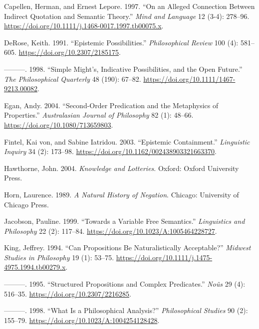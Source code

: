 \documentclass[
  11pt,
  letterpaper,
  DIV=11,
  numbers=noendperiod]{scrartcl}
\newlength{\cslhangindent}
\newenvironment{CSLReferences}[2] %
 {\begin{list}{}{%
  \setlength{\itemindent}{0pt}
  \setlength{\leftmargin}{0pt}
  \setlength{\parsep}{0pt}
  \ifodd #1
   \setlength{\leftmargin}{\cslhangindent}
   \setlength{\itemindent}{-1\cslhangindent}
  \fi
  \setlength{\itemsep}{#2\baselineskip}}}
 {\end{list}}
\begin{document}
\label{refs}
\begin{CSLReferences}{1}{0}
Capellen, Herman, and Ernest Lepore. 1997. {``On an Alleged Connection
Between Indirect Quotation and Semantic Theory.''} \emph{Mind and
Language} 12 (3-4): 278--96.
\url{https://doi.org/10.1111/j.1468-0017.1997.tb00075.x}.

DeRose, Keith. 1991. {``Epistemic Possibilities.''} \emph{Philosophical
Review} 100 (4): 581--605. \url{https://doi.org/10.2307/2185175}.

---------. 1998. {``Simple Might's, Indicative Possibilities, and the
Open Future.''} \emph{The Philosophical Quarterly} 48 (190): 67--82.
\url{https://doi.org/10.1111/1467-9213.00082}.

Egan, Andy. 2004. {``Second-Order Predication and the Metaphysics of
Properties.''} \emph{Australasian Journal of Philosophy} 82 (1): 48--66.
\url{https://doi.org/10.1080/713659803}.

Fintel, Kai von, and Sabine Iatridou. 2003. {``Epistemic Containment.''}
\emph{Linguistic Inquiry} 34 (2): 173--98.
\url{https://doi.org/10.1162/002438903321663370}.

Hawthorne, John. 2004. \emph{Knowledge and Lotteries}. Oxford: Oxford
University Press.

Horn, Laurence. 1989. \emph{A Natural History of Negation}. Chicago:
University of Chicago Press.

Jacobson, Pauline. 1999. {``Towards a Variable Free Semantics.''}
\emph{Linguistics and Philosophy} 22 (2): 117--84.
\url{https://doi.org/10.1023/A:1005464228727}.

King, Jeffrey. 1994. {``Can Propositions Be Naturalistically
Acceptable?''} \emph{Midwest Studies in Philosophy} 19 (1): 53--75.
\url{https://doi.org/10.1111/j.1475-4975.1994.tb00279.x}.

---------. 1995. {``Structured Propositions and Complex Predicates.''}
\emph{No{û}s} 29 (4): 516--35. \url{https://doi.org/10.2307/2216285}.

---------. 1998. {``What Is a Philosophical Analysis?''}
\emph{Philosophical Studies} 90 (2): 155--79.
\url{https://doi.org/10.1023/A:1004254128428}.


\end{CSLReferences}
\end{document}
